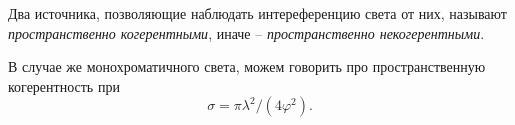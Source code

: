 \begin{to_def}
    Два источника, позволяющие наблюдать интереференцию света от них, называют \textit{пространственно когерентными}, иначе -- \textit{пространственно некогерентными}. 
\end{to_def}

В случае же монохроматичного света, можем говорить про пространственную когерентность при 
\begin{equation*}
    \sigma =\pi \lambda^2 / (4 \varphi^2). 
\end{equation*}